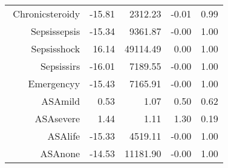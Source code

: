 \begin{tabular}{rrrrr}
$$  Chronic\-steroid\-y & -15.81 & 2312.23 & -0.01 & 0.99 \\ 
  Sepsis\-sepsis & -15.34 & 9361.87 & -0.00 & 1.00 \\ 
  Sepsis\-shock & 16.14 & 49114.49 & 0.00 & 1.00 \\ 
  Sepsis\-sirs & -16.01 & 7189.55 & -0.00 & 1.00 \\ 
  Emergency\-y & -15.43 & 7165.91 & -0.00 & 1.00 \\ 
  ASA\-mild & 0.53 & 1.07 & 0.50 & 0.62 \\ 
  ASA\-severe & 1.44 & 1.11 & 1.30 & 0.19 \\ 
  ASA\-life & -15.33 & 4519.11 & -0.00 & 1.00 \\ 
  ASA\-none & -14.53 & 11181.90 & -0.00 & 1.00 \\ 
   \hline
\end{tabular}

